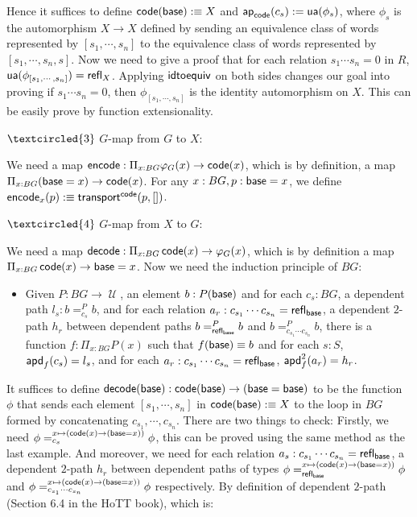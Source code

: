 \documentclass[11pt]{article}
\DeclareMathOperator{\cu}{\mathcal U}
\DeclareMathOperator{\base}{\sf base}
\DeclareMathOperator{\ap}{\sf ap}
\DeclareMathOperator{\code}{\sf code}
\DeclareMathOperator{\ua}{\sf ua}
\DeclareMathOperator{\apd}{\sf apd}
\DeclareMathOperator{\encode}{\sf encode}
\DeclareMathOperator{\decode}{\sf decode}
\DeclareMathOperator{\transport}{\sf transport}
\DeclareMathOperator{\rfl}{\sf refl}
\DeclareMathOperator{\idtoequiv}{\sf idtoequiv}
\theoremstyle{definition}
\begin{document}
Hence it suffices to define $\code(\base) :\equiv X$ and $\ap_{\code}(c_s) := \ua(\phi_s)$, where $\phi_s$ is the automorphism $X\to X$ defined by sending an equivalence class of words represented by $[s_1,\cdots,s_n]$ to the equivalence class of words represented by $[s_1,\cdots,s_n,s]$. Now we need to give a proof that for each relation $s_1\cdots s_n=0$ in $R$, $\ua(\phi_{[s_1,\cdots ,s_n]})=\rfl_{X}$. Applying $\idtoequiv$ on both sides changes our goal into proving if $s_1\cdots s_n=0$, then $\phi_{[s_1,\cdots ,s_n]}$ is the identity automorphism on $X$. This can be easily prove by function extensionality.


$\textcircled{3}$ $G$-map from $G$ to $X$:

We need a map $\encode :\Pi_{x:BG}\varphi_{G}(x)\to \code (x)$, which is by definition, a map $\Pi_{x:BG}(\base = x)\to \code (x)$. For any $x: BG,p:\base = x$, we define $\encode_x(p):\equiv \transport^{\code}(p,[])$.

$\textcircled{4}$ $G$-map from $X$ to $G$:

We need a map $\decode :\Pi_{x:BG}\code (x)\to \varphi_{G}(x)$, which is by definition a map $\Pi_{x:BG}\code (x)\to \base = x$. Now we need the  induction principle of $BG$:
\begin{itemize}
\item Given $P: BG\to \cu$, an element $b: P(\base)$ and for each $c_s:BG$, a dependent path $l_s:b=_{c_s}^Pb$, and for each relation $a_r:c_{s_1} \cdots  c_{s_n}=\rfl_{\base}$, a dependent $2$-path $h_r$ between dependent paths $b=^P_{\rfl_{\base}}b$ and $b=^P_{c_{s_1} \cdots c_{s_n}}b$, there is a function $f:\Pi_{x: BG}P(x)$ such that $f(\base)\equiv b$ and for each $s: S$, $\apd_f(c_s)=l_s$, and for each $a_r: c_{s_1} \cdots  c_{s_n}=\rfl_{\base}$, $\apd^2_f(a_r)=h_r$.
\end{itemize}
It suffices to define $\decode (\base) : \code (\base) \to (\base = \base)$ to be the function $\phi$ that sends each element $[s_1,\cdots,s_n]$ in $\code(\base):\equiv X$ to the loop in $BG$ formed by concatenating $c_{s_1},\cdots,c_{s_n}$. There are two things to check: Firstly, we need  $\phi=_{c_s}^{x\mapsto (\code (x)\to (\base = x))}\phi$, this can be proved using the same method as the last example. And moreover, we need for each relation $a_s:c_{s_1} \cdots  c_{s_n}=\rfl_{\base}$, a dependent $2$-path $h_r$ between dependent paths of types $\phi=^{x\mapsto (\code (x)\to (\base = x))}_{\rfl_{\base}}\phi$ and $\phi=^{x\mapsto (\code (x)\to (\base = x))}_{c_{s_1} \cdots c_{s_n}}\phi$ respectively. By definition of dependent $2$-path (Section 6.4 in the HoTT book), which is:
\end{document}
